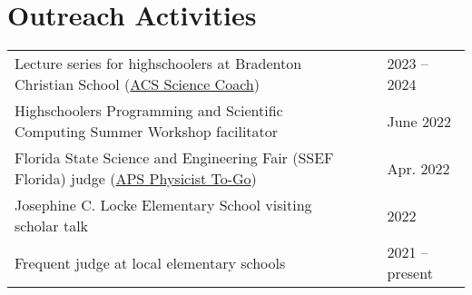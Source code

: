 \documentclass[letterpaper,11pt]{article}
\begin{document}
\section*{Outreach Activities}
\begin{tabular}{@{}p{}p{} l@{}}
     Lecture series for highschoolers at Bradenton Christian School (\href{https://www.acs.org/education/outreach/science-coaches.html}{ACS Science Coach})		& & 2023 -- 2024 \\[4pt]
     Highschoolers Programming and Scientific Computing Summer Workshop facilitator	 	& & June 2022 \\[4pt]
     Florida State Science and Engineering Fair (SSEF Florida) judge (\href{https://www.aps.org/programs/outreach/physiciststogo.cfm}{APS Physicist To-Go})	& & Apr. 2022 \\[4pt]
     Josephine C. Locke Elementary School visiting scholar talk              			& & 2022 \\[4pt]
     Frequent judge at local elementary schools                             			& & 2021 -- present \\[4pt]
\end{tabular}

\vspace{-0.58cm}
\begin{refsection}[talks]
 \nocite{*}
 \setlength\bibitemsep{0pt}
 \printbibliography[resetnumbers=true,type=inproceedings,title={Selected Presentations},heading=fix]
\end{refsection}

\vspace{-0.5cm}
\end{document}
